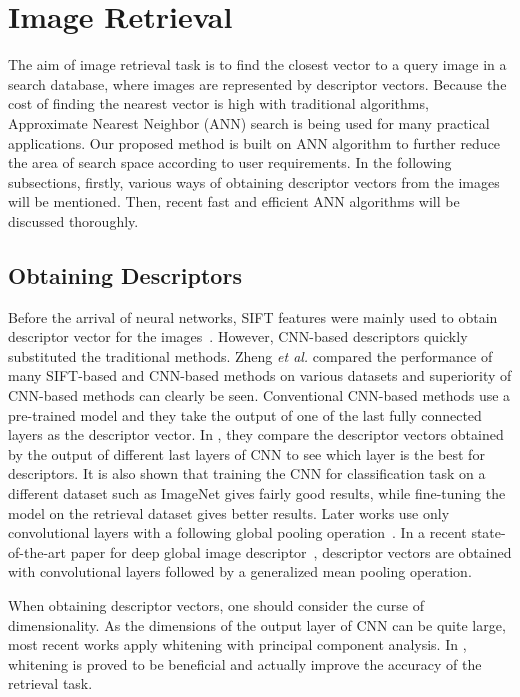 \section{Image Retrieval}

The aim of image retrieval task is to find the closest vector to a query image in a search database, where images are represented by descriptor vectors.
Because the cost of finding the nearest vector is high with traditional algorithms, Approximate Nearest Neighbor (ANN) search is being used for many practical applications.
Our proposed method is built on ANN algorithm to further reduce the area of search space according to user requirements. 
In the following subsections, firstly, various ways of obtaining descriptor vectors from the images will be mentioned. 
Then, recent fast and efficient ANN algorithms will be discussed thoroughly. 

\subsection{Obtaining Descriptors}

Before the arrival of neural networks, SIFT features were mainly used to obtain descriptor vector for the images~\cite{philbin2007object}\cite{jegou2010aggregating}. 
However, CNN-based descriptors quickly substituted the traditional methods. 
Zheng \emph{et al.} compared the performance of many SIFT-based and CNN-based methods on various datasets and superiority of CNN-based methods can clearly be seen. 
Conventional CNN-based methods use a pre-trained model and they take the output of one of the last fully connected layers as the descriptor vector. 
In \cite{babenko2014neural}, they compare the descriptor vectors obtained by the output of different last layers of CNN to see which layer is the best for descriptors.
It is also shown that training the CNN for classification task on a different dataset such as ImageNet gives fairly good results, while fine-tuning the model on the retrieval dataset gives better results.
Later works use only convolutional layers with a following global pooling operation~\cite{razavian2016visual}\cite{tolias2015particular}. 
In a recent state-of-the-art paper for deep global image descriptor~\cite{radenovic2018fine}, descriptor vectors are obtained with convolutional layers followed by a generalized mean pooling operation.

When obtaining descriptor vectors, one should consider the curse of dimensionality. 
As the dimensions of the output layer of CNN can be quite large, most recent works apply whitening with principal component analysis. 
In \cite{jegou2012negative}, whitening is proved to be beneficial and actually improve the accuracy of the retrieval task.

